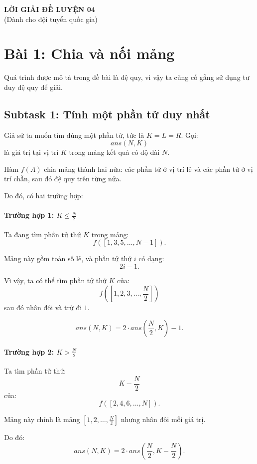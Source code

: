 \begin{center}
    {\LARGE \textbf{LỜI GIẢI ĐỀ LUYỆN 04}}\\[6pt]
    {\large (Dành cho đội tuyển quốc gia)}
\end{center}

\section*{Bài 1: Chia và nối mảng}

Quá trình được mô tả trong đề bài là đệ quy, vì vậy ta cũng cố gắng sử dụng tư duy đệ quy để giải.

\subsection*{Subtask 1: Tính một phần tử duy nhất}

Giả sử ta muốn tìm đúng một phần tử, tức là $K = L = R$. Gọi:
\[
ans(N, K)
\]
là giá trị tại vị trí $K$ trong mảng kết quả có độ dài $N$.

Hàm $f(A)$ chia mảng thành hai nửa: các phần tử ở vị trí lẻ và các phần tử ở vị trí chẵn, sau đó đệ quy trên từng nửa.

Do đó, có hai trường hợp:

\paragraph{Trường hợp 1: $K \le \frac{N}{2}$}

Ta đang tìm phần tử thứ $K$ trong mảng:
\[
f([1,3,5,\dots,N-1]).
\]

Mảng này gồm toàn số lẻ, và phần tử thứ $i$ có dạng:
\[
2i - 1.
\]

Vì vậy, ta có thể tìm phần tử thứ $K$ của:
\[
f([1,2,3,\dots,\frac{N}{2}])
\]
sau đó nhân đôi và trừ đi $1$.

\[
ans(N,K) = 2 \cdot ans\!\left(\frac{N}{2}, K\right) - 1.
\]

\paragraph{Trường hợp 2: $K > \frac{N}{2}$}

Ta tìm phần tử thứ:
\[
K - \frac{N}{2}
\]
của:
\[
f([2,4,6,\dots,N]).
\]

Mảng này chính là mảng $[1,2,\dots,\frac{N}{2}]$ nhưng nhân đôi mỗi giá trị.

Do đó:
\[
ans(N,K) = 2 \cdot ans\!\left(\frac{N}{2}, K - \frac{N}{2}\right).
\]

